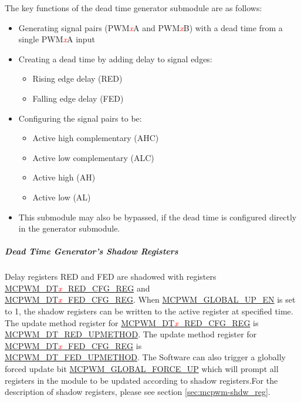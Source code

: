 \documentclass[main\_\_EN.tex]{subfiles}
\begin{document}
The key functions of the dead time generator submodule are as follows:
\begin{itemize}
    \item Generating signal pairs (PWM\textcolor{red}{\it{x}}A and PWM\textcolor{red}{\it{x}}B) with a dead time from a single PWM\textcolor{red}{\it{x}}A input
    \item Creating a dead time by adding delay to signal edges:
    \begin{itemize}
        \item Rising edge delay (RED)
        \item Falling edge delay (FED)
    \end{itemize}
    \item Configuring the signal pairs to be:
    \begin{itemize}
        \item Active high complementary (AHC)
        \item Active low complementary (ALC)
        \item Active high (AH)
        \item Active low (AL)
    \end{itemize}
    \item This submodule may also be bypassed, if the dead time is configured directly in the generator submodule.
\end{itemize}

\subparagraph{Dead Time Generator's Shadow Registers}
Delay registers RED and FED are shadowed with registers \hyperref[regdesc:MCPWMDT0REDCFGREG]{MCPWM\_DT\textcolor{red}{\it{x}}\_RED\_CFG\_REG} and \\\hyperref[regdesc:MCPWMDT0FEDCFGREG]{MCPWM\_DT\textcolor{red}{\it{x}}\_FED\_CFG\_REG}. When \hyperref[fielddesc:MCPWMGLOBALUPEN]{MCPWM\_GLOBAL\_UP\_EN} is set to 1, the shadow registers can be written to the active register at specified time. The update method register for \hyperref[regdesc:MCPWMDT0REDCFGREG]{MCPWM\_DT\textcolor{red}{\it{x}}\_RED\_CFG\_REG} is \\\hyperref[fielddesc:MCPWMDT0REDUPMETHOD]{MCPWM\_DT\_RED\_UPMETHOD}. The update method register for \hyperref[regdesc:MCPWMDT0FEDCFGREG]{MCPWM\_DT\textcolor{red}{\it{x}}\_FED\_CFG\_REG} is \\\hyperref[fielddesc:MCPWMDT0FEDUPMETHOD]{MCPWM\_DT\_FED\_UPMETHOD}. The Software can also trigger a globally forced update bit \hyperref[fielddesc:MCPWMGLOBALFORCEUP]{MCPWM\_GLOBAL\_FORCE\_UP} which will prompt all registers in the module to be updated according to shadow registers.For the description of shadow registers, please see section \ref{sec:mcpwm-shdw_reg}.
\end{document}
